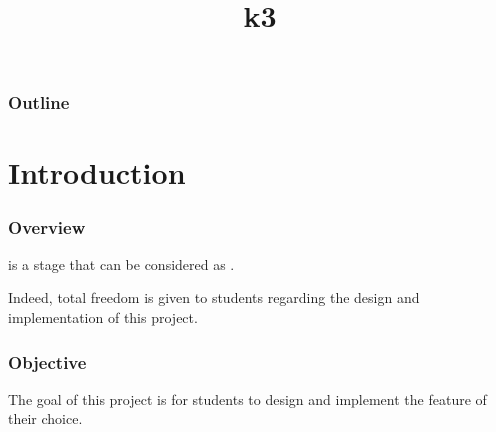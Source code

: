 %
%
%
%
%
%

%
%

%
%

\def\path{../../..}

%
%



%
%

\title{k3}

%
%



%
%

\begin{frame}
  \titlepage
\end{frame}

%
%

\begin{frame}
  \frametitle{Outline}

  \tableofcontents
\end{frame}

%
%

%
%

\section{Introduction}


\begin{frame}
  \frametitle{Overview}

   is a stage that can be considered as .

  \-

  Indeed, total freedom is given to students regarding the design and
  implementation of this project.
\end{frame}


\begin{frame}
  \frametitle{Objective}

  The goal of this project is for students to design and implement the
  feature of their choice.
\end{frame}

